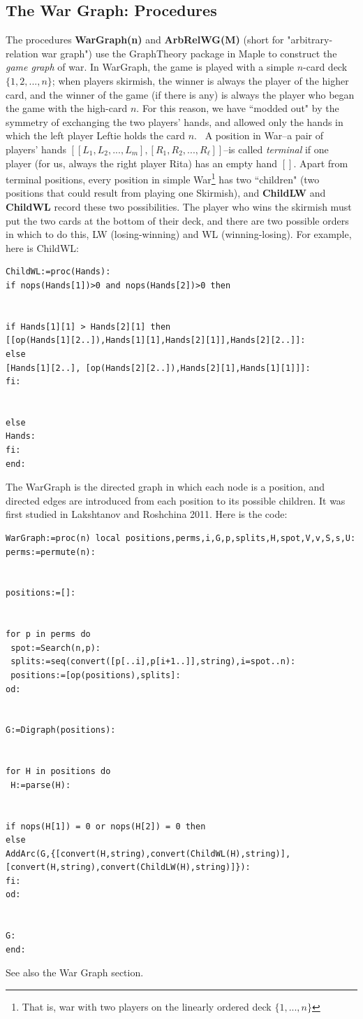\documentclass[12pt]{amsart}
\begin{document}
\subsection{The War Graph: Procedures}
The procedures \textbf{WarGraph(n)} and \textbf{ArbRelWG(M)} (short for "arbitrary-relation war graph")
use the GraphTheory package in Maple to construct the \emph{game graph} of war.
In WarGraph, the game is played with a simple $n$-card deck $\{1,2,...,n\}$; when players skirmish,
the winner is always the player of the higher card, and the winner of the game (if there is any) is always the player who began the game with the high-card $n$. For this reason, we have ``modded out" by the symmetry
of exchanging the two players' hands, and allowed only the hands in which the left player Leftie holds the card $n$. 
A position in War--a pair of players' hands $[[L_1, L_2,...,L_m],[R_1,R_2,...,R_\ell]]$--is called \emph{terminal}
if one player (for us, always the right player Rita) has an empty hand $[]$. Apart from terminal positions,
every position in simple War\footnote{That is, war with two players on the linearly ordered deck $\{1,...,n\}$} has two ``children" (two positions that could result from playing one Skirmish), and \textbf{ChildLW} and \textbf{ChildWL} record these two possibilities. The player who wins the skirmish must put the two cards at the bottom of their deck, and there are two possible orders in which to do this, LW (losing-winning) and WL (winning-losing). For example, here is ChildWL:
\begin{lstlisting}
ChildWL:=proc(Hands):
if nops(Hands[1])>0 and nops(Hands[2])>0 then


if Hands[1][1] > Hands[2][1] then
[[op(Hands[1][2..]),Hands[1][1],Hands[2][1]],Hands[2][2..]]:
else
[Hands[1][2..], [op(Hands[2][2..]),Hands[2][1],Hands[1][1]]]:
fi:


else
Hands:
fi:
end:
\end{lstlisting}
The WarGraph is the directed graph in which each node is a position, and directed edges are introduced
from each position to its possible children. It was first studied in Lakshtanov and Roshchina 2011. Here is the code:
\begin{lstlisting}
WarGraph:=proc(n) local positions,perms,i,G,p,splits,H,spot,V,v,S,s,U:
perms:=permute(n): 


positions:=[]:


for p in perms do
 spot:=Search(n,p):
 splits:=seq(convert([p[..i],p[i+1..]],string),i=spot..n):
 positions:=[op(positions),splits]:
od:


G:=Digraph(positions):


for H in positions do
 H:=parse(H):


if nops(H[1]) = 0 or nops(H[2]) = 0 then
else
AddArc(G,{[convert(H,string),convert(ChildWL(H),string)],
[convert(H,string),convert(ChildLW(H),string)]}):
fi:
od:


G:
end:
\end{lstlisting}
See also the War Graph section. 
\end{document}
